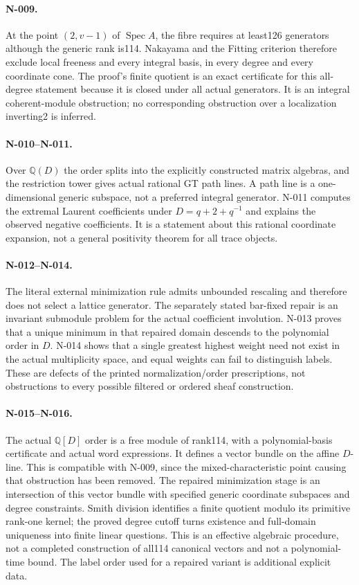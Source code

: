 \paragraph{N-009.}
At the point $(2,v-1)$ of $\operatorname{Spec}A$, the fibre
requires at least126 generators although the generic rank
is114.  Nakayama and the Fitting criterion therefore exclude
local freeness and every integral basis, in every degree
and every coordinate cone.  The proof's finite quotient is
an exact certificate for this all-degree statement because
it is closed under all actual generators.  It is an integral
coherent-module obstruction; no corresponding obstruction
over a localization inverting2 is inferred.

\paragraph{N-010--N-011.}
Over $\mathbb Q(D)$ the order splits into the explicitly
constructed matrix algebras, and the restriction tower gives
actual rational GT path lines.  A path line is a one-dimensional
generic subspace, not a preferred integral generator.
N-011 computes the extremal Laurent coefficients under
$D=q+2+q^{-1}$ and explains the observed negative coefficients.
It is a statement about this rational coordinate expansion,
not a general positivity theorem for all trace objects.

\paragraph{N-012--N-014.}
The literal external minimization rule admits unbounded
rescaling and therefore does not select a lattice generator.
The separately stated bar-fixed repair is an invariant
submodule problem for the actual coefficient involution.
N-013 proves that a unique minimum in that repaired domain
descends to the polynomial order in $D$.  N-014 shows that
a single greatest highest weight need not exist in the
actual multiplicity space, and equal weights can fail to
distinguish labels.  These are defects of the printed
normalization/order prescriptions, not obstructions to
every possible filtered or ordered sheaf construction.

\paragraph{N-015--N-016.}
The actual $\mathbb Q[D]$ order is a free module of rank114,
with a polynomial-basis certificate and actual word expressions.
It defines
a vector bundle on the affine $D$-line.  This is compatible
with N-009, since the mixed-characteristic point causing
that obstruction has been removed.  The repaired
minimization stage is an intersection of this vector bundle
with specified generic coordinate subspaces and degree
constraints.  Smith division identifies a finite quotient
modulo its primitive rank-one kernel; the proved degree
cutoff turns existence and full-domain uniqueness into
finite linear questions.  This is an effective algebraic
procedure, not a completed construction of all114 canonical
vectors and not a polynomial-time bound.  The label order
used for a repaired variant is additional explicit data.

